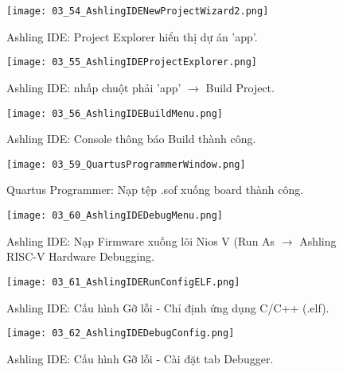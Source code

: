 \begin{figure}[htbp] \centering \texttt{[image: 03\_54\_AshlingIDENewProjectWizard2.png]} \caption{Ashling IDE: Project Explorer hiển thị dự án 'app'.} \label{fig:03_54} \end{figure}
\begin{figure}[htbp] \centering \texttt{[image: 03\_55\_AshlingIDEProjectExplorer.png]} \caption{Ashling IDE: nhấp chuột phải 'app' $\longrightarrow$ Build Project.} \label{fig:03_55} \end{figure}
\begin{figure}[htbp] \centering \texttt{[image: 03\_56\_AshlingIDEBuildMenu.png]} \caption{Ashling IDE: Console thông báo Build thành công.} \label{fig:03_56} \end{figure}
\begin{figure}[htbp] \centering \texttt{[image: 03\_59\_QuartusProgrammerWindow.png]} \caption{Quartus Programmer: Nạp tệp .sof xuống board thành công.} \label{fig:03_59} \end{figure}
\begin{figure}[htbp] \centering \texttt{[image: 03\_60\_AshlingIDEDebugMenu.png]} \caption{Ashling IDE: Nạp Firmware xuống lõi Nios V (Run As $\longrightarrow$ Ashling RISC-V Hardware Debugging.} \label{fig:03_60} \end{figure}
\begin{figure}[htbp] \centering \texttt{[image: 03\_61\_AshlingIDERunConfigELF.png]} \caption{Ashling IDE: Cấu hình Gỡ lỗi - Chỉ định ứng dụng C/C++ (.elf).} \label{fig:03_61} \end{figure}
\begin{figure}[htbp] \centering \texttt{[image: 03\_62\_AshlingIDEDebugConfig.png]} \caption{Ashling IDE: Cấu hình Gỡ lỗi - Cài đặt tab Debugger.} \label{fig:03_62} \end{figure}
